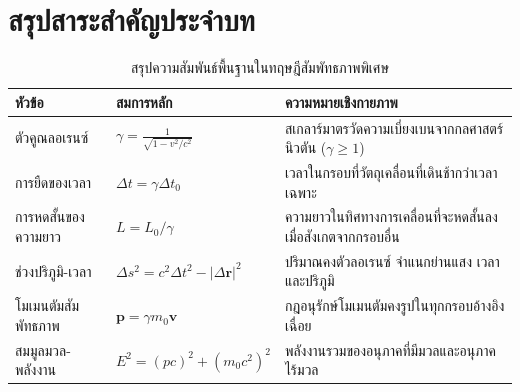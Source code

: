 \section{สรุปสาระสำคัญประจำบท}

\begin{table}[H]
\centering
\small
\begin{tabularx}{\textwidth}{l >{\centering\arraybackslash}p{4.2cm} Y}
\toprule
\textbf{หัวข้อ} & \textbf{สมการหลัก} & \textbf{ความหมายเชิงกายภาพ} \\
\midrule
ตัวคูณลอเรนซ์ & $\gamma = \frac{1}{\sqrt{1 - v^2/c^2}}$ & สเกลาร์มาตรวัดความเบี่ยงเบนจากกลศาสตร์นิวตัน ($\gamma \ge 1$) \\
การยืดของเวลา & $\Delta t = \gamma \Delta t_0$ & เวลาในกรอบที่วัตถุเคลื่อนที่เดินช้ากว่าเวลาเฉพาะ \\
การหดสั้นของความยาว & $L = L_0 / \gamma$ & ความยาวในทิศทางการเคลื่อนที่จะหดสั้นลงเมื่อสังเกตจากกรอบอื่น \\
ช่วงปริภูมิ-เวลา & $\Delta s^2 = c^2\Delta t^2 - |\Delta\mathbf{r}|^2$ & ปริมาณคงตัวลอเรนซ์ จำแนกย่านแสง เวลา และปริภูมิ \\
โมเมนตัมสัมพัทธภาพ & $\mathbf{p} = \gamma m_0 \mathbf{v}$ & กฎอนุรักษ์โมเมนตัมคงรูปในทุกกรอบอ้างอิงเฉื่อย \\
สมมูลมวล-พลังงาน & $E^2 = (pc)^2 + (m_0 c^2)^2$ & พลังงานรวมของอนุภาคที่มีมวลและอนุภาคไร้มวล \\
\bottomrule
\end{tabularx}
\caption{สรุปความสัมพันธ์พื้นฐานในทฤษฎีสัมพัทธภาพพิเศษ}
\label{tab:relativity_summary}
\end{table}

